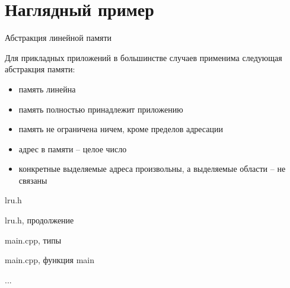 \documentclass[unknownkeysallowed,xcolor=table]{beamer}
\makeatletter
\newcommand{\srcbigsize}{\@setfontsize{\srcbigsize}{8pt}{8pt}}
\newcommand{\srcsize}{\@setfontsize{\srcsize}{6pt}{6pt}}
\makeatother
\begin{document}
\section{Наглядный пример}

\begin{frame}{Абстракция линейной памяти}

Для прикладных приложений в большинстве случаев применима следующая абстракция памяти:

\vspace{1em}

\begin{itemize}
  \item память линейна \vspace{0.5em}
  \item память полностью принадлежит приложению \vspace{0.5em}
  \item память не ограничена ничем, кроме пределов адресации \vspace{0.5em}
  \item адрес в памяти -- целое число \vspace{0.5em}
  \item конкретные выделяемые адреса произвольны, а выделяемые области -- не связаны
\end{itemize}

\end{frame}

\begin{frame}[fragile]{lru.h}

\end{frame}

\begin{frame}[fragile]{lru.h, продолжение}

\end{frame}

\begin{frame}[fragile]{main.cpp, типы}

\end{frame}

\begin{frame}[fragile]{main.cpp, функция main}

...

\end{frame}
\end{document}
